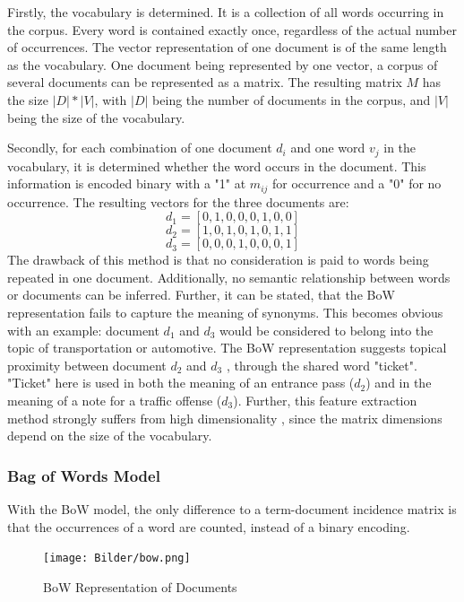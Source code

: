            Firstly, the vocabulary is determined. 
            It is a collection of all words occurring in the corpus. Every word is contained exactly once, regardless of the actual number of occurrences. The vector representation of one document is of the same length as the vocabulary. One document being represented by one vector, a corpus of several documents can be represented as a matrix. The resulting matrix $M$ has the size $ |D|*|V| $, with $|D|$ being the number of documents in the corpus, and $|V|$ being the size of the vocabulary.
            
            Secondly, for each combination of one document $ d_{i} $ and one word $ v_{j} $ in the vocabulary, it is determined whether the word occurs in the document. This information is encoded binary with a "1" at $m_{ij}$ for occurrence and a "0" for no occurrence. The resulting vectors for the three documents are:
            \[ d_{1} = [0,1,0,0,0,1,0,0] \]
            \[ d_{2} = [1,0,1,0,1,0,1,1] \]
            \[ d_{3} = [0,0,0,1,0,0,0,1]\]
    		The drawback of this method is that no consideration is paid to words being repeated in one document. Additionally, no semantic relationship between words or documents can be inferred. 
    		Further, it can be stated, that the \ac{BoW} representation fails to capture the meaning of synonyms. This becomes obvious with an example: document $ d_{1} $ and $ d_{3}$ would be considered to belong into the topic of transportation or automotive. The \ac{BoW} representation suggests topical proximity between document $ d_{2} $ and $ d_{3}$ , through the shared word "ticket". "Ticket" here is used in both the meaning of an entrance pass ($d_{2}$) and in the meaning of a note for a traffic offense  ($d_{3}$). 
    		Further, this feature extraction method strongly suffers from high dimensionality \cite[ch.~3.2]{practicalNLP}, since the matrix dimensions depend on the size of the vocabulary. 
    
            \subsubsection{Bag of Words Model}
 			With the \ac{BoW} model, the only difference to a term-document incidence matrix is that the occurrences of a word are counted, instead of a binary encoding.
             \begin{figure}[ht]
            	\centering
            	\texttt{[image: Bilder/bow.png]}
            	\caption{\acl{BoW} Representation of Documents}
            	\label{fig:bag-of-words}
            \end{figure}
            
